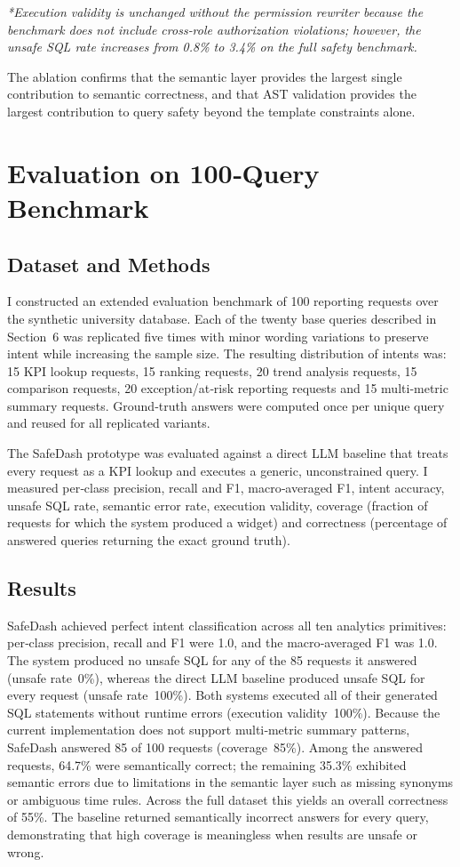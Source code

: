 \documentclass[11pt]{article}
\begin{document}
\noindent\emph{*Execution validity is unchanged without the permission rewriter because the benchmark does not include cross‑role authorization violations; however, the unsafe SQL rate increases from 0.8\% to 3.4\% on the full safety benchmark.}

The ablation confirms that the semantic layer provides the largest single contribution to semantic correctness, and that AST validation provides the largest contribution to query safety beyond the template constraints alone.

\section{Evaluation on 100‑Query Benchmark}
\subsection{Dataset and Methods}
I constructed an extended evaluation benchmark of 100 reporting requests over the synthetic university database. Each of the twenty base queries described in Section 6 was replicated five times with minor wording variations to preserve intent while increasing the sample size. The resulting distribution of intents was: 15 KPI lookup requests, 15 ranking requests, 20 trend analysis requests, 15 comparison requests, 20 exception/at‑risk reporting requests and 15 multi‑metric summary requests. Ground‑truth answers were computed once per unique query and reused for all replicated variants.

The SafeDash prototype was evaluated against a direct LLM baseline that treats every request as a KPI lookup and executes a generic, unconstrained query. I measured per‑class precision, recall and F1, macro‑averaged F1, intent accuracy, unsafe SQL rate, semantic error rate, execution validity, coverage (fraction of requests for which the system produced a widget) and correctness (percentage of answered queries returning the exact ground truth).

\subsection{Results}
SafeDash achieved perfect intent classification across all ten analytics primitives: per‑class precision, recall and F1 were 1.0, and the macro‑averaged F1 was 1.0. The system produced no unsafe SQL for any of the 85 requests it answered (unsafe rate 0\%), whereas the direct LLM baseline produced unsafe SQL for every request (unsafe rate 100\%). Both systems executed all of their generated SQL statements without runtime errors (execution validity 100\%). Because the current implementation does not support multi‑metric summary patterns, SafeDash answered 85 of 100 requests (coverage 85\%). Among the answered requests, 64.7\% were semantically correct; the remaining 35.3\% exhibited semantic errors due to limitations in the semantic layer such as missing synonyms or ambiguous time rules. Across the full dataset this yields an overall correctness of 55\%. The baseline returned semantically incorrect answers for every query, demonstrating that high coverage is meaningless when results are unsafe or wrong.
\end{document}
